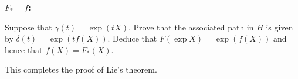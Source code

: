 \documentclass[12pt]{article}
\begin{document}
\iffalse
\begin{answer}
We want to show that $w=uv$ and we do this by showing that they both solve the same ordinary differential equation with the same initial conditions. Differentiating:
\begin{align*}
\dot{w}&=wf(\gamma^{-1}\dot{\gamma})\\
&=wf(\beta^{-1}\alpha^{-1}(\dot{\alpha}\beta+\alpha\dot{\beta})\\
&=wf(\beta^{-1}\alpha^{-1}\dot{\alpha}\beta)+wf(\beta^{-1}\dot{\beta})\\
&=wv^{-1}f(\alpha^{-1}\dot{\alpha})v+wf(\beta^{-1}\dot{\beta})
\end{align*}
where we used Question \ref{qun:intertwined} in this last line. We also have
\[\frac{d}{dt}(uv)=\dot{u}v+u\dot{v}=uf(\alpha^{-1}\dot{\alpha}v+uvf(\beta^{-1}\dot{\beta})\]
so we see that both $uv$ and $w$ solve
\[dz/dt=zv^{-1}f(\alpha^{-1}\dot{\alpha})v+zf(\beta^{-1}\dot{\beta})\]
with initial condition $z(0)=1$.
\end{answer}
\fi

{\bf $F_*=f$:}

\begin{question}
Suppose that $\gamma(t)=\exp(tX)$. Prove that the associated path in $H$ is given by $\delta(t)=\exp(tf(X))$. Deduce that $F(\exp X)=\exp(f(X))$ and hence that $f(X)=F_*(X)$.
\end{question}

\iffalse
\begin{answer}
Since $\dot{\gamma}(t)=\gamma(t)X$ we have $A(t)=X$ and hence the associated path is defined by the equation $\dot{\delta}(t)=\delta(t)f(X)$ and $\delta(0)=1$. Thus $\delta(t)=\exp(tf(X))$ by uniqueness of solutions to ODEs. Therefore $F(\exp X)=\delta(1)=\exp(f(X))$ so $F_*=f$.
\end{answer}
\fi

This completes the proof of Lie's theorem. \qedhere
\end{document}
